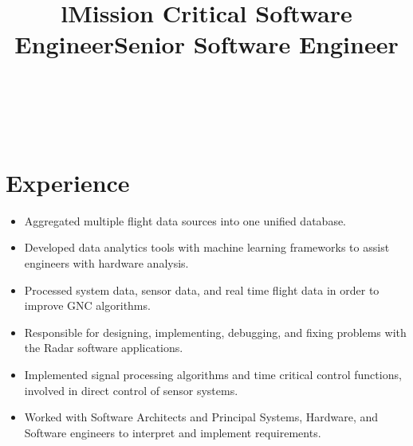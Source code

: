 \documentclass[margin]{res}
\begin{document}
\begin{resume}

\begin{format}
\title{l}\\
\\
\end{format}

\section{Experience}
\phantom{spacing}
\title{\textbf{Mission Critical Software Engineer}}
\begin{position}
\begin{itemize}[noitemsep, topsep=0pt]
\item Aggregated multiple flight data sources into one unified database. 
\item Developed data analytics tools with machine learning frameworks to assist engineers with hardware analysis. 
\item Processed system data, sensor data, and real time flight data in order to improve GNC algorithms. 
\end{itemize}
\end{position}

\title{\textbf{Senior Software Engineer}}
\begin{position}
\begin{itemize}[noitemsep, topsep=0pt]
\item Responsible for designing, implementing, debugging, and fixing problems with the Radar software applications.
\item Implemented signal processing algorithms and time critical control functions, involved in direct control of sensor systems. 
\item Worked with Software Architects and Principal Systems, Hardware, and Software engineers to interpret and implement requirements. 
\end{itemize}
\end{position}


\end{resume}
\end{document}
